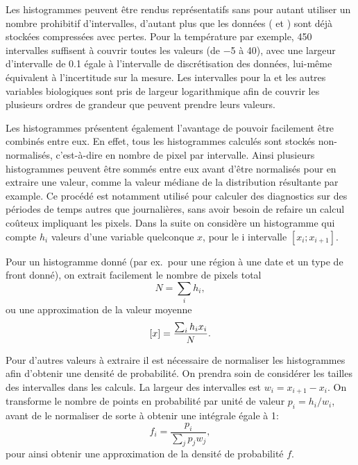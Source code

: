 \documentclass[index]{subfiles}
\begin{document}
Les histogrammes peuvent être rendus représentatifs sans pour autant utiliser un nombre prohibitif d'intervalles, d'autant plus que les données ( et ) sont déjà stockées compressées avec pertes. Pour la température par exemple, 450 intervalles suffisent à couvrir toutes les valeurs (de \qty{-5}{\dC} à \qty{40}{\dC}), avec une largeur d'intervalle de \qty{0.1}{\dC} égale à l'intervalle de discrétisation des données, lui-même équivalent à l'incertitude sur la mesure.
Les intervalles pour la  et les autres variables biologiques sont pris de largeur logarithmique afin de couvrir les plusieurs ordres de grandeur que peuvent prendre leurs valeurs.

Les histogrammes présentent également l'avantage de pouvoir facilement être combinés entre eux.
En effet, tous les histogrammes calculés sont stockés non-normalisés, c'est-à-dire en nombre de pixel par intervalle. Ainsi plusieurs histogrammes peuvent être sommés entre eux avant d'être normalisés pour en extraire une valeur, comme la valeur médiane de la distribution résultante par example.
Ce procédé est notamment utilisé pour calculer des diagnostics sur des périodes de temps autres que journalières, sans avoir besoin de refaire un calcul coûteux impliquant les pixels.
Dans la suite on considère un histogramme qui compte \(h_i\) valeurs d'une variable quelconque \(x\), pour le i\ieme{} intervalle \(\left[x_i; x_{i+1} \right]\).

Pour un histogramme donné (par ex.\ pour une région à une date et un type de front donné), on extrait facilement le nombre de pixels total
\begin{equation}
  N = \sum_i h_i,
\end{equation}
ou une approximation de la valeur moyenne
\begin{equation}
  \left[ x \right] = \frac{\sum_i h_i x_i} {N}.
\end{equation}

Pour d'autres valeurs à extraire il est nécessaire de normaliser les histogrammes afin d'obtenir une densité de probabilité. On prendra soin de considérer les tailles des intervalles dans les calculs.
La largeur des intervalles est \(w_i = x_{i+1}-x_i\). On transforme le nombre de points en probabilité par unité de valeur \(p_i = h_i / w_i \), avant de le normaliser de sorte à obtenir une intégrale égale à 1:
\begin{equation}
  f_i = \frac{p_i} {\sum_j p_j w_j},
\end{equation}
pour ainsi obtenir une approximation de la densité de probabilité \(f\).
\end{document}
